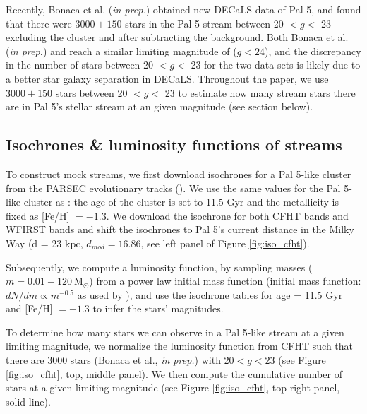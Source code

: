 \documentclass[twocolumn]{aastex62}
\newcommand{\msun}{\textrm{M}_\odot}
\newcommand{\todo}[1]{{\color{red} TODO: #1}}
\begin{document}
Recently, Bonaca et al. ({\it in prep.}) obtained new DECaLS data of Pal 5, and found that there were $3000 \pm 150$ stars in the Pal 5 stream between 20 $< g <$ 23 excluding the cluster and after subtracting the background. Both Bonaca et al. ({\it in prep.}) and  \citet{ibata16} reach a similar limiting magnitude of ($g < 24$), and the discrepancy in the number of stars  between 20 $< g <$ 23 for the two data sets is likely due to a better star galaxy separation in DECaLS. Throughout the paper, we use $3000 \pm 150$ stars between 20 $< g <$ 23 to estimate how many stream stars there are in Pal 5's stellar stream at an given magnitude (see section below).

\subsection{Isochrones \& luminosity functions of streams}
\label{sec:lum}
To construct mock streams, we first download isochrones for a Pal 5-like cluster from the PARSEC evolutionary tracks (\citealt{bressan12}). We use the same values for the Pal 5-like cluster as \citet{ibata17}: the age of the cluster is set to 11.5 Gyr and the metallicity is fixed as [Fe/H] $= -1.3$. We download the isochrone for both CFHT bands and WFIRST bands and shift the isochrones to Pal 5's current distance in the Milky Way (d = 23 kpc, $d_{mod} = 16.86$, see left panel of Figure \ref{fig:iso_cfht}). 

Subsequently, we compute a luminosity function, by sampling masses ($m = 0.01 - 120 ~\msun$) from a power law initial mass function (initial mass function: $dN/dm \propto m^{-0.5}$ as used by \citealt{ibata16}), and use the isochrone tables for age = 11.5 Gyr and [Fe/H] $= -1.3$ to infer the stars' magnitudes. 

To determine how many stars we can observe in a Pal 5-like stream at a given limiting magnitude, we normalize the luminosity function from CFHT such that there are  $3000$ stars (Bonaca et al., {\it in prep.}) with $20 < g < 23$ (see Figure \ref{fig:iso_cfht}, top, middle panel). We then compute the cumulative number of stars at a given limiting magnitude (see Figure \ref{fig:iso_cfht}, top right panel, solid line).
\end{document}
